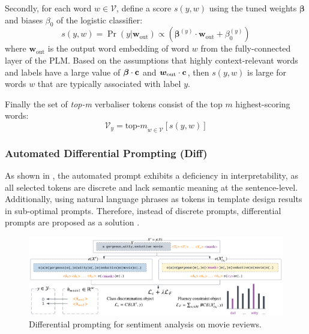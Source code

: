 Secondly, for each word $w \in \mathcal{V}$, define a score $s(y, w)$ using the tuned weights $\boldsymbol{\beta}$ and biases $\beta_0$ of the logistic classifier:
\begin{equation}
    s(y, w) = \Pr(y|\boldsymbol{w}_{\text{out}}) \propto (\boldsymbol{\beta}^{(y)} \cdot \boldsymbol{w}_{\text{out}}  + \beta_0^{(y)})
\end{equation}
where $\boldsymbol{w}_{\text{out}}$ is the output word embedding of word $w$ from the fully-connected layer of the PLM. Based on the assumptions that highly context-relevant words and labels have a large value of $\boldsymbol{\beta} \cdot \bold{c}$ and $\boldsymbol{w}_{\text{out}} \cdot \bold{c}$, then $s(y,w)$ is large for words $w$ that are typically associated with label $y$.

Finally the set of \emph{top-m} verbaliser tokens consist of the top $m$ highest-scoring words:
\begin{equation}
    \mathcal{V}_y = {\text{top-}m}_{w \in \mathcal{V}}[s(y,w)]
\end{equation}

\subsubsection{Automated Differential Prompting (Diff)}
As shown in , the automated prompt exhibits a deficiency in interpretability, as all selected tokens are discrete and lack semantic meaning at the sentence-level. Additionally, using natural language phrases as tokens in template design results in sub-optimal prompts. Therefore, instead of discrete prompts, differential prompts are proposed as a solution \cite{zhang2021differentiable}. 

\begin{figure}[!ht]
    \centering
    \includegraphics[width=\hsize]{figures/preparation_media/prepare-diff.pdf}
    \caption{Differential prompting for sentiment analysis on movie reviews.}
    \label{fig:prepare-diff}
\end{figure}


